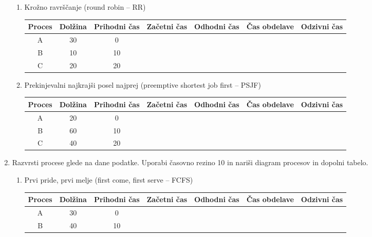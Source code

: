 \documentclass{book}
\begin{document}
\begin{enumerate}
\begin{enumerate}
            \item Krožno ravrščanje (round robin – RR) \\
                \begin{tabular}{|c|c|c|c|c|c|c|}
                    \hline
                    Proces & Dolžina & Prihodni čas & Začetni čas & Odhodni čas & Čas obdelave & Odzivni čas \\
                    \hline
                    A & 30 & 0 & & & & \\
                    \hline
                    B & 10 & 10 & & & & \\
                    \hline
                    C & 20 & 20 & & & & \\
                    \hline
                \end{tabular}
            \item Prekinjevalni najkrajši posel najprej (preemptive shortest job first – PSJF) \\
                \begin{tabular}{|c|c|c|c|c|c|c|}
                    \hline
                    Proces & Dolžina & Prihodni čas & Začetni čas & Odhodni čas & Čas obdelave & Odzivni čas \\
                    \hline
                    A & 20 & 0 & & & & \\
                    \hline
                    B & 60 & 10 & & & & \\
                    \hline
                    C & 40 & 20 & & & & \\
                    \hline
                \end{tabular}
        \end{enumerate}
    \item Razvrsti procese glede na dane podatke. Uporabi časovno rezino 10 in nariši diagram procesov in dopolni tabelo.
        \begin{enumerate}
            \item Prvi pride, prvi melje (first come, first serve – FCFS) \\
                \begin{tabular}{|c|c|c|c|c|c|c|}
                    \hline
                    Proces & Dolžina & Prihodni čas & Začetni čas & Odhodni čas & Čas obdelave & Odzivni čas \\
                    \hline
                    A & 30 & 0 & & & & \\
                    \hline
                    B & 40 & 10 & & & & \\

\end{tabular}
\end{enumerate}
\end{enumerate}
\end{document}
